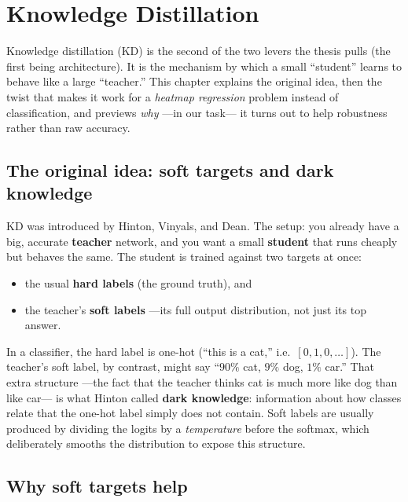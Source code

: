 \chapter{Knowledge Distillation}
\label{ch:distill}

Knowledge distillation (KD) is the second of the two levers the thesis pulls (the first being
architecture). It is the mechanism by which a small ``student'' learns to behave like a large
``teacher.'' This chapter explains the original idea, then the twist that makes it work for a
\emph{heatmap regression} problem instead of classification, and previews \emph{why} ---in our task---
it turns out to help robustness rather than raw accuracy.

\section{The original idea: soft targets and dark knowledge}
\label{sec:distill:hinton}

KD was introduced by Hinton, Vinyals, and Dean. The setup: you already have a big, accurate
\textbf{teacher} network, and you want a small \textbf{student} that runs cheaply but behaves the
same. The student is trained against two targets at once:
\begin{itemize}[leftmargin=1.4em,nosep]
  \item the usual \textbf{hard labels} (the ground truth), and
  \item the teacher's \textbf{soft labels} ---its full output distribution, not just its top answer.
\end{itemize}
In a classifier, the hard label is one-hot (``this is a cat,'' i.e.\ $[0,1,0,\dots]$). The teacher's
soft label, by contrast, might say ``$90\%$ cat, $9\%$ dog, $1\%$ car.'' That extra structure ---the
fact that the teacher thinks cat is much more like dog than like car--- is what Hinton called
\textbf{dark knowledge}: information about how classes relate that the one-hot label simply does not
contain. Soft labels are usually produced by dividing the logits by a \emph{temperature} before the
softmax, which deliberately smooths the distribution to expose this structure.

\section{Why soft targets help}
\label{sec:distill:why}


